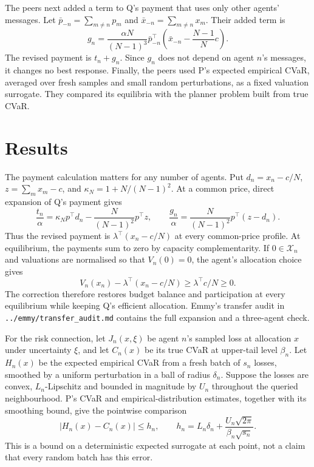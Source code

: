 \documentclass{article}
\begin{document}
The peers next added a term to Q's payment that uses only other agents' messages. Let \(\bar p_{-n}=\sum_{m\ne n}p_m\)
and \(\bar x_{-n}=\sum_{m\ne n}x_m\). Their added term is
\[
g_n=\frac{\alpha N}{(N-1)^3}\bar p_{-n}^{\top}
\left(\bar x_{-n}-\frac{N-1}{N}c\right).
\]
The revised payment is \(t_n+g_n\). Since \(g_n\) does not depend on agent \(n\)'s messages, it changes no best
response. Finally, the peers used P's expected empirical CVaR, averaged over fresh samples and small random
perturbations, as a fixed valuation surrogate. They compared its equilibria with the planner problem built from true
CVaR.

\section{Results}

The payment calculation matters for any number of agents. Put \(d_n=x_n-c/N\), \(z=\sum_m x_m-c\), and
\(\kappa_N=1+N/(N-1)^2\). At a common price, direct expansion of Q's payment gives
\[
\frac{t_n}{\alpha}=\kappa_Np^\top d_n
-\frac{N}{(N-1)^2}p^\top z,
\qquad
\frac{g_n}{\alpha}=\frac{N}{(N-1)^2}p^\top(z-d_n).
\]
Thus the revised payment is \(\lambda^\top(x_n-c/N)\) at every common-price profile. At equilibrium, the payments sum
to zero by capacity complementarity. If \(0\in\mathcal X_n\) and valuations are normalised so that \(V_n(0)=0\), the
agent's allocation choice gives
\[
V_n(x_n)-\lambda^\top(x_n-c/N)
\geq \lambda^\top c/N\geq 0.
\]
The correction therefore restores budget balance and participation at every equilibrium while keeping Q's efficient
allocation. Emmy's transfer audit in \texttt{../emmy/transfer\_audit.md} contains the full expansion and a three-agent
check.

For the risk connection, let \(J_n(x,\xi)\) be agent \(n\)'s sampled loss at allocation \(x\) under uncertainty
\(\xi\), and let \(C_n(x)\) be its true CVaR at upper-tail level \(\beta_n\). Let \(H_n(x)\) be the expected empirical
CVaR from a fresh batch of \(s_n\) losses, smoothed by a uniform perturbation in a ball of radius \(\delta_n\). Suppose
the losses are convex, \(L_n\)-Lipschitz and bounded in magnitude by \(U_n\) throughout the queried neighbourhood. P's
CVaR and empirical-distribution estimates, together with its smoothing bound, give the pointwise comparison
\[
|H_n(x)-C_n(x)|\leq h_n,
\qquad
h_n=L_n\delta_n+\frac{U_n\sqrt{2\pi}}{\beta_n\sqrt{s_n}}.
\]
This is a bound on a deterministic expected surrogate at each point, not a claim that every random batch has this error.
\end{document}

